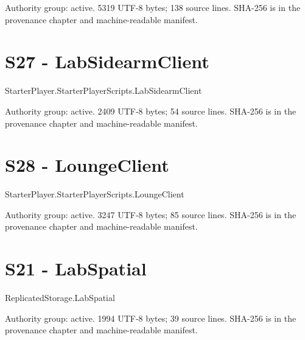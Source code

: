 Authority group: active.\allowbreak{} 5319 UTF-8 bytes; 138 source lines.\allowbreak{} SHA-256 is in the provenance chapter and machine-readable manifest.\allowbreak{}

\begingroup{}
\endgroup
\chapter{S27 - LabSidearmClient}
\label{src:S27}
StarterPlayer.\allowbreak{}StarterPlayerScripts.\allowbreak{}LabSidearmClient

Authority group: active.\allowbreak{} 2409 UTF-8 bytes; 54 source lines.\allowbreak{} SHA-256 is in the provenance chapter and machine-readable manifest.\allowbreak{}

\begingroup{}
\endgroup
\chapter{S28 - LoungeClient}
\label{src:S28}
StarterPlayer.\allowbreak{}StarterPlayerScripts.\allowbreak{}LoungeClient

Authority group: active.\allowbreak{} 3247 UTF-8 bytes; 85 source lines.\allowbreak{} SHA-256 is in the provenance chapter and machine-readable manifest.\allowbreak{}

\begingroup{}
\endgroup
\chapter{S21 - LabSpatial}
\label{src:S21}
ReplicatedStorage.\allowbreak{}LabSpatial

Authority group: active.\allowbreak{} 1994 UTF-8 bytes; 39 source lines.\allowbreak{} SHA-256 is in the provenance chapter and machine-readable manifest.\allowbreak{}

